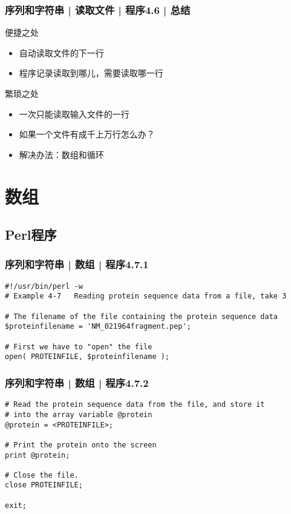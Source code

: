 \begin{frame}[fragile]
  \frametitle{序列和字符串 | 读取文件 | 程序4.6 | 总结}
  \begin{block}{便捷之处}
    \begin{itemize}
      \item 自动读取文件的下一行
      \item 程序记录读取到哪儿，需要读取哪一行
    \end{itemize}
  \end{block}
  \pause
  \begin{block}{繁琐之处}
    \begin{itemize}
      \item 一次只能读取输入文件的一行
      \item 如果一个文件有成千上万行怎么办？
      \item 解决办法：数组和循环
    \end{itemize}
  \end{block}
\end{frame}

\section{数组}
\subsection{Perl程序}
\begin{frame}[fragile]
  \frametitle{序列和字符串 | 数组 | 程序4.7.1}
\begin{lstlisting}
#!/usr/bin/perl -w
# Example 4-7   Reading protein sequence data from a file, take 3

# The filename of the file containing the protein sequence data
$proteinfilename = 'NM_021964fragment.pep';

# First we have to "open" the file
open( PROTEINFILE, $proteinfilename );
\end{lstlisting}
\end{frame}

\begin{frame}[fragile]
  \frametitle{序列和字符串 | 数组 | 程序4.7.2}
\begin{lstlisting}[firstnumber=10]
# Read the protein sequence data from the file, and store it
# into the array variable @protein
@protein = <PROTEINFILE>;

# Print the protein onto the screen
print @protein;

# Close the file.
close PROTEINFILE;

exit;
\end{lstlisting}
\end{frame}

